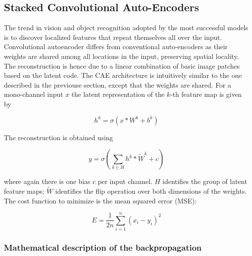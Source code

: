 \documentclass[final, paper=letter,5p,times,twocolumn]{elsarticle}
\begin{document}
\subsection{Stacked Convolutional Auto-Encoders}

The trend in vision and object recognition adopted by the most successful models is to discover localized features that repeat themselves all over the input. Convolutional autoencoder differs from conventional auto-encoders as their weights are shared among all locations in the input, preserving spatial locality. The reconstruction is hence due to a linear combination of basic image patches based on the latent code. The CAE architecture is intuitively similar to the one described in the previouse section, except that the weights are shared. For a mono-channel input $x$ the latent representation of the $k$-th feature map is given by

\begin{equation*}
h^{k} = \sigma(x*W^{k} + b^{k})
\end{equation*}

The reconstruction is obtained using

\begin{equation*}
y = \sigma \left(\sum_{k \in H} h^{k}*\tilde{W}^{k} + c \right)
\end{equation*}

where again there is one bias $c$ per input channel. $H$ identifies the group of latent feature maps; $\tilde{W}$ identifies the flip operation over both dimensions of the weights. The cost function to minimize is the mean squared error (MSE):

\begin{equation*}
E= \frac{1}{2n} \sum_{i=1}^{n} ( x_{i} - y_{i})^{2}
\end{equation*}

\subsubsection{Mathematical description of the backpropagation}
\end{document}
